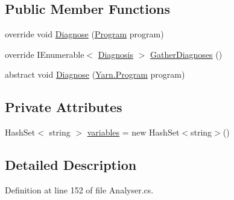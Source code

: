 \subsection*{Public Member Functions}
\begin{DoxyCompactItemize}
\item 
override void \hyperlink{a00168_a980f0e64bc5ad171c35ec19bdf838b5c}{Diagnose} (\hyperlink{a00140}{Program} program)
\item 
override I\-Enumerable$<$ \hyperlink{a00089}{Diagnosis} $>$ \hyperlink{a00168_ab84e7a8e68740379dee12a51dca69b07}{Gather\-Diagnoses} ()
\item 
abstract void \hyperlink{a00052_aba4a36cb823b11ee491074e26477d084}{Diagnose} (\hyperlink{a00140}{Yarn.\-Program} program)
\end{DoxyCompactItemize}
\subsection*{Private Attributes}
\begin{DoxyCompactItemize}
\item 
Hash\-Set$<$ string $>$ \hyperlink{a00168_a64ed6c3394c474b6cf5804a35f560746}{variables} = new Hash\-Set$<$string$>$()
\end{DoxyCompactItemize}


\subsection{Detailed Description}


Definition at line 152 of file Analyser.\-cs.



